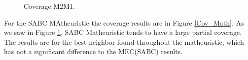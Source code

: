 \begin{figure}[H]
\hspace{0.4cm}%
\vspace{0.4cm}
\caption{Coverage M2M1.}
\label{Cov_M2M1}
\end{figure}

For the SABC MAtheuristic the coverage results are in Figure \ref{Cov_Math}. As we saw in Figure \ref{Cov_M2M1}, SABC Matheuristic tends to have a large partial coverage. The results are for the best neighbor found throughout the matheuristic, which has not a significant difference to the MEC(SABC) results.

